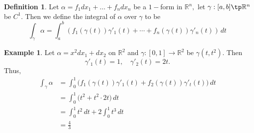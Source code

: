 \documentclass[10pt, oneside]{article}
\newcommand{\bbR}{\mathbb{R}}
\theoremstyle{definition}
\newtheorem{exmp}{Example}[section]
\newtheorem{defn}{Definition}
\begin{document}
\begin{defn}
    Let $\alpha = f_1dx_1+\dots + f_ndx_n$ be a $1-$form in $\bbR^n,$ let $\gamma: [a,b]\tp \bbR^n$ be $C^1.$ Then we define the integral of $\alpha$ over $\gamma$ to be 
    \[\int_\gamma \alpha = \int_a^b \left(f_1(\gamma(t))\gamma'_1(t) + \cdots + f_n(\gamma(t))\gamma'_n(t)\right) \, dt\]
\end{defn}
\begin{exmp}
    Let $\alpha = x^2 dx_1 + dx_2$ on $\bbR^2$ and $\gamma: [0,1]\to \bbR^2$ be $\gamma(t,t^2).$ Then 
    \[\gamma'_1(t) = 1, \quad \gamma'_2(t) = 2t.\]
    Thus, 
    \begin{align*}
        \int_\gamma \alpha &= \int_0^1 \bigg(f_1 (\gamma(t))\gamma'_1(t) + f_2(\gamma(t))\gamma'_t(t)\bigg)\,dt\\
        &= \int_0^1 \bigg(t^2 + t^2\cdot 2t\bigg)\,dt\\
        &= \int_0^1 t^2 \, dt + 2\int_0^1 t^3 \, dt\\
        &= \frac{4}{3}
    \end{align*}
\end{exmp}


\newpage
\end{document}
